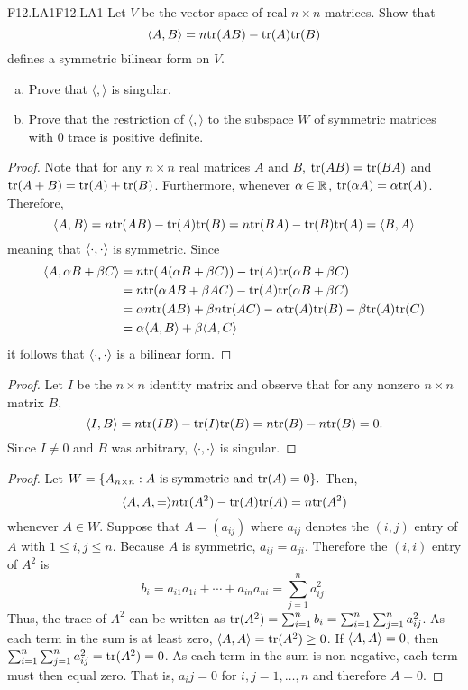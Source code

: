 \documentclass[../../AlgebraQualSolutions.tex]{subfiles}
\begin{document}
\begin{prob}{F12.LA1}{F12.LA1}
    Let $V$ be the vector space of real $n \times n$ matrices. Show that 	
        \[\langle A, B \rangle = n \mathrm{tr}(AB) - \mathrm{tr}(A)\mathrm{tr}(B) \]
    defines a symmetric bilinear form on $V$.
    \begin{enumerate}[(a)]
    \item Prove that $\langle,\rangle$ is singular.
    \item Prove that the restriction of $\langle,\rangle$ to the subspace $W$ of symmetric matrices with 0 trace is positive definite.
    \end{enumerate}
    \end{prob}
    
    \begin{proof}
        Note that for any $n \times n$ real matrices $A$ and $B$, $\mathrm{tr}(AB) = \mathrm{tr}(BA)$ and $\mathrm{tr}(A+B) = \mathrm{tr}(A) + \mathrm{tr}(B)$. Furthermore, whenever $\alpha \in \mathbb{R}$, $\mathrm{tr}(\alpha A) = \alpha \mathrm{tr}(A)$. Therefore,
            \[\langle A, B\rangle = n \mathrm{tr}(AB) - \mathrm{tr}(A)\mathrm{tr}(B) = n \mathrm{tr}(BA) - \mathrm{tr}(B)\mathrm{tr}(A) = \langle B, A\rangle\]
        meaning that $\langle \cdot, \cdot\rangle$ is symmetric. Since
            \begin{align*}
                \langle A, \alpha B + \beta C\rangle &= n\mathrm{tr}(A(\alpha B + \beta C)) - \mathrm{tr}(A) \mathrm{tr}(\alpha B + \beta C)\\
                &= n\mathrm{tr}(\alpha AB + \beta AC) - \mathrm{tr}(A) \mathrm{tr}(\alpha B + \beta C)\\
                &= \alpha n \mathrm{tr}(AB) + \beta n \mathrm{tr}(AC) - \alpha \mathrm{tr}(A)\mathrm{tr}(B) - \beta \mathrm{tr}(A)\mathrm{tr}(C)\\
                &= \alpha \langle A, B\rangle + \beta\langle A, C\rangle
            \end{align*}
        it follows that $\langle \cdot, \cdot\rangle$ is a bilinear form.
    \end{proof}
    
    \begin{proof}
        Let $I$ be the $n \times n$ identity matrix and observe that for any nonzero $n \times n$ matrix $B$,
            \[\langle I, B\rangle = n\mathrm{tr}(IB) - \mathrm{tr}(I)\mathrm{tr}(B) = n\mathrm{tr}(B) - n \mathrm{tr}(B) = 0.\]
        Since $I \neq 0$ and $B$ was arbitrary, $\langle \cdot, \cdot\rangle$ is singular.
    \end{proof}
    
    \begin{proof}
        Let $W = \{A_{n\times n}: A \textrm{ is symmetric  and } \mathrm{tr}(A) = 0\}.$ Then,
            \[\langle A,A, =\rangle n\mathrm{tr}(A^2) - \mathrm{tr}(A)\mathrm{tr}(A) = n\mathrm{tr}(A^2)\]
        whenever $A \in W$. Suppose that $A = (a_{ij})$ where $a_{ij}$ denotes the $(i,j)$ entry of $A$ with $1\leq i,j \leq n$. Because $A$ is symmetric, $a_{ij} = a_{ji}$. Therefore the $(i,i)$ entry of $A^2$ is
            \[b_i = a_{i1}a_{1i} + \cdots + a_{in}a_{ni} = \sum_{j=1}^n a_{ij}^2. \]
        Thus, the trace of $A^2$ can be written as $\mathrm{tr}(A^2) = \sum_{i=1}^n b_i = \sum_{i=1}^n \sum_{j=1}^n a_{ij}^2$. As each term in the sum is at least zero, $\langle A, A\rangle = \mathrm{tr}(A^2) \geq 0$. If $\langle A, A\rangle = 0$, then $\sum_{i=1}^n \sum_{j=1}^n a_{ij}^2 = \mathrm{tr}(A^2) = 0$. As each term in the sum is non-negative, each term must then equal zero. That is, $a_ij = 0$ for $i,j = 1, \ldots, n$ and therefore $A = 0$.
    \end{proof}
    
\end{document}
